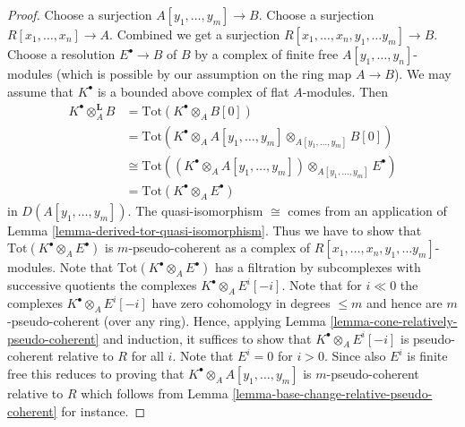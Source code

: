 \documentclass[10pt,a4paper]{amsart}
\theoremstyle{plain}
\theoremstyle{definition}
\theoremstyle{remark}
\numberwithin{equation}{subsection}
\begin{document}
\begin{proof}
Choose a surjection $A[y_1, \ldots, y_m] \to B$.
Choose a surjection $R[x_1, \ldots, x_n] \to A$.
Combined we get a surjection $R[x_1, \ldots, x_n, y_1, \ldots y_m] \to B$.
Choose a resolution $E^\bullet \to B$ of $B$ by a complex of
finite free $A[y_1, \ldots, y_n]$-modules (which is possible
by our assumption on the ring map $A \to B$). We may assume
that $K^\bullet$ is a bounded above complex of flat $A$-modules. Then
\begin{align*}
K^\bullet \otimes_A^{\mathbf{L}} B & =
\text{Tot}(K^\bullet \otimes_A B[0]) \\
& = \text{Tot}(K^\bullet \otimes_A A[y_1, \ldots, y_m]
\otimes_{A[y_1, \ldots, y_m]} B[0]) \\
& \cong
\text{Tot}\left(
(K^\bullet \otimes_A A[y_1, \ldots, y_m])
\otimes_{A[y_1, \ldots, y_m]} E^\bullet
\right) \\
& =
\text{Tot}(K^\bullet \otimes_A E^\bullet)
\end{align*}
in $D(A[y_1, \ldots, y_m])$. The quasi-isomorphism $\cong$ comes from
an application of
Lemma \ref{lemma-derived-tor-quasi-isomorphism}.
Thus we have to show that
$\text{Tot}(K^\bullet \otimes_A E^\bullet)$ is $m$-pseudo-coherent
as a complex of $R[x_1, \ldots, x_n, y_1, \ldots y_m]$-modules.
Note that $\text{Tot}(K^\bullet \otimes_A E^\bullet)$ has a filtration by
subcomplexes with successive quotients the complexes
$K^\bullet \otimes_A E^i[-i]$. Note that for $i \ll 0$ the
complexes $K^\bullet \otimes_A E^i[-i]$ have zero cohomology
in degrees $\leq m$ and hence are $m$-pseudo-coherent (over any ring).
Hence, applying
Lemma \ref{lemma-cone-relatively-pseudo-coherent}
and induction, it suffices to show that $K^\bullet \otimes_A E^i[-i]$ is
pseudo-coherent relative to $R$ for all $i$. Note that $E^i = 0$ for
$i > 0$. Since also $E^i$ is finite free this
reduces to proving that $K^\bullet \otimes_A A[y_1, \ldots, y_m]$ is
$m$-pseudo-coherent relative to $R$ which follows from
Lemma \ref{lemma-base-change-relative-pseudo-coherent}
for instance.
\end{proof}
\end{document}
